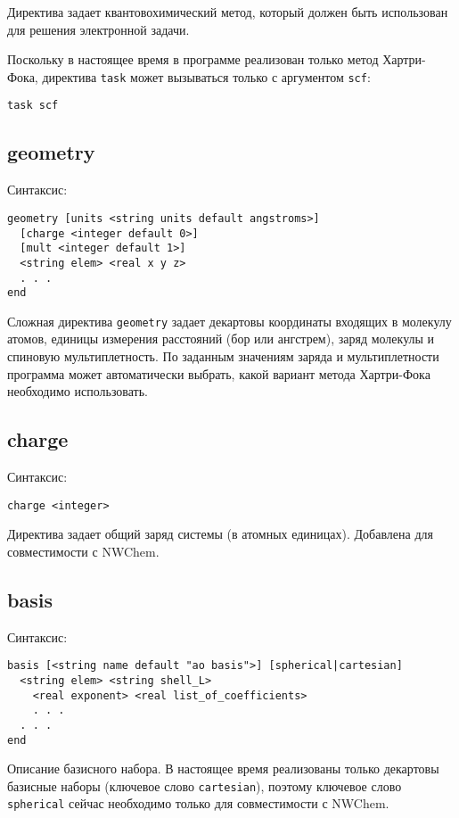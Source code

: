 \documentclass[a4paper, 12pt]{article}
\begin{document}
Директива задает квантовохимический метод, который должен быть использован для решения электронной задачи.

Поскольку в настоящее время в программе реализован только метод Хартри-Фока, директива \texttt{task} может вызываться только с аргументом \texttt{scf}:
\begin{lstlisting}
task scf
\end{lstlisting}

\subsection{geometry}

Синтаксис:

\begin{lstlisting}
geometry [units <string units default angstroms>]
  [charge <integer default 0>]
  [mult <integer default 1>]
  <string elem> <real x y z>
  . . .
end
\end{lstlisting}

Сложная директива \texttt{geometry} задает декартовы координаты входящих в молекулу атомов, единицы измерения расстояний (бор или ангстрем), заряд молекулы и спиновую мультиплетность. По заданным значениям заряда и мультиплетности программа может автоматически выбрать, какой вариант метода Хартри-Фока необходимо использовать.

\subsection{charge}
Синтаксис:

\begin{lstlisting}
charge <integer>
\end{lstlisting}

Директива задает общий заряд системы (в атомных единицах). Добавлена для совместимости с NWChem.

\subsection{basis}

Синтаксис:

\begin{lstlisting}
basis [<string name default "ao basis">] [spherical|cartesian]
  <string elem> <string shell_L>
    <real exponent> <real list_of_coefficients>
    . . .
  . . .
end
\end{lstlisting}

Описание базисного набора. В настоящее время реализованы только декартовы базисные наборы (ключевое слово \texttt{cartesian}), поэтому ключевое слово \texttt{spherical} сейчас необходимо только для совместимости с NWChem.
\end{document}
